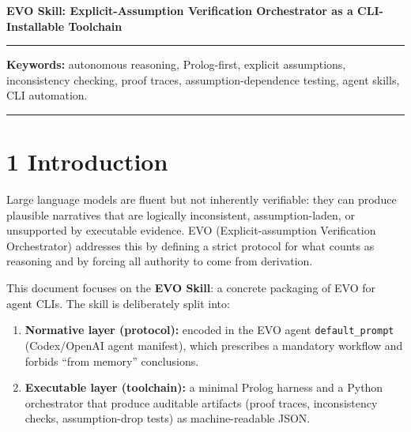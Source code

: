 \documentclass[12pt,a4paper]{article}
\begin{document}
\begin{center}
{\LARGE\bfseries EVO Skill: Explicit-Assumption Verification Orchestrator as a CLI-Installable Toolchain}
\end{center}
\bigskip

\medskip\noindent\rule{\linewidth}{0.4pt}\medskip

\begin{abstract}
This paper describes the \textbf{EVO Skill}---a practical packaging of EVO (Explicit-assumption Verification Orchestrator) as an installable skill for agent CLIs. EVO inverts the dominant ``LLM-first'' pattern by requiring that conclusions be \textit{derived} (not merely explained) from a symbolic model, with assumptions made explicit, consistency verified, and assumption-dependence tested. The EVO Skill operationalizes this protocol by coupling a strict \texttt{default\_prompt} with an executable local toolchain: a minimal Prolog harness for proof tracing and inconsistency detection, a Python runner that orchestrates the harness, and a companion \texttt{prolog-runner} skill that executes SWI-Prolog and returns JSON bindings. We document the formal model, the mandatory workflow (including solution classification and uniqueness rules), and the concrete file-level implementation for Codex CLI and Claude Code.
\end{abstract}
\noindent\textbf{Keywords:} autonomous reasoning, Prolog-first, explicit assumptions, inconsistency checking, proof traces, assumption-dependence testing, agent skills, CLI automation.

\medskip\noindent\rule{\linewidth}{0.4pt}\medskip

\section{1 Introduction}

Large language models are fluent but not inherently verifiable: they can produce plausible narratives that are logically inconsistent, assumption-laden, or unsupported by executable evidence. EVO (Explicit-assumption Verification Orchestrator) addresses this by defining a strict protocol for what counts as reasoning and by forcing all authority to come from derivation.

This document focuses on the \textbf{EVO Skill}: a concrete packaging of EVO for agent CLIs. The skill is deliberately split into:
\begin{enumerate}[leftmargin=*,topsep=2pt,itemsep=2pt]
\item \textbf{Normative layer (protocol):} encoded in the EVO agent \texttt{default\_prompt} (Codex/OpenAI agent manifest), which prescribes a mandatory workflow and forbids ``from memory'' conclusions.
\item \textbf{Executable layer (toolchain):} a minimal Prolog harness and a Python orchestrator that produce auditable artifacts (proof traces, inconsistency checks, assumption-drop tests) as machine-readable JSON.
\end{enumerate}
\end{document}
